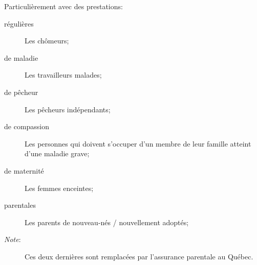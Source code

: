 \documentclass[10pt, french]{article}
\begin{document}
\begin{multicols*}{3}
\begin{definitionNOHFILLsub}[Objectifs]
Particulièrement avec des prestations:
\begin{description}
	\item[régulières]	Les chômeurs;	
	\item[de maladie]	Les travailleurs malades;
	\item[de pêcheur]	Les pêcheurs indépendants;
	\item[de compassion]	Les personnes qui doivent s'occuper d'un membre de leur famille atteint d'une maladie grave;
	\item[de maternité]	Les femmes enceintes;
	\item[parentales]	Les parents de nouveau-nés / nouvellement adoptés;
	\item[\textit{Note}:]	Ces deux dernières sont remplacées par l'assurance parentale au Québec.
\end{description}
\end{definitionNOHFILLsub}


\columnbreak

\end{multicols*}
\end{document}
